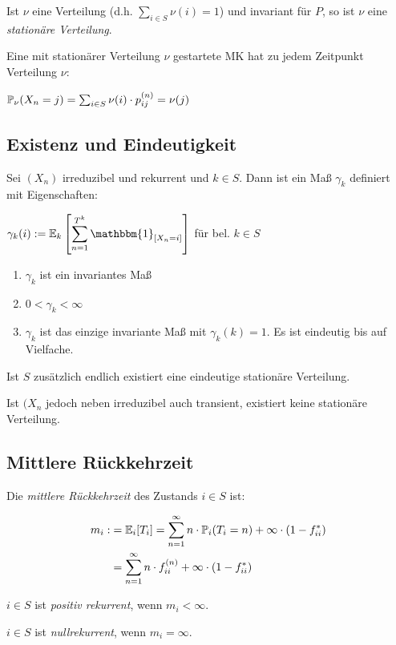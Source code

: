 \vspace*{1mm}

Ist $\nu$ eine Verteilung (d.h. $\sum_{i \in S} \nu(i) = 1$) und invariant für $P$, so ist $\nu$ eine \emph{stationäre Verteilung}.

\vspace*{1mm}

Eine mit stationärer Verteilung $\nu$ gestartete MK hat zu jedem Zeitpunkt Verteilung $\nu$:

$\P_\nu(X_n = j) = \sum_{i \in S} \nu(i) \cdot p_{ij}^{(n)} = \nu(j)$

\subsection*{Existenz und Eindeutigkeit}

Sei $(X_n)$ irreduzibel und rekurrent und $k \in S$. Dann ist ein Maß $\gamma_k$ definiert mit Eigenschaften:

$\gamma_k(i) := \mathbb{E}_k\left[\displaystyle\sum_{n=1}^{T^k} \mathbbm{1}_{[X_n=i]}\right]$ für bel. $k \in S$

\begin{enumerate}[label=(\alph*)]
	\item $\gamma_k$ ist ein invariantes Maß
	\item $0 < \gamma_k < \infty$
	\item $\gamma_k$ ist das einzige invariante Maß mit $\gamma_k(k) = 1$. Es ist eindeutig bis auf Vielfache.
\end{enumerate}

Ist $S$ zusätzlich endlich existiert eine eindeutige stationäre Verteilung.

Ist $(X_n$ jedoch neben irreduzibel auch transient, existiert keine stationäre Verteilung.

\subsection*{Mittlere Rückkehrzeit}

Die \emph{mittlere Rückkehrzeit} des Zustands $i \in S$ ist:

\vspace*{-4mm}
\begin{align*}
m_i :&= \mathbb{E}_i[T_i] = \sum_{n=1}^\infty n \cdot \P_i(T_i = n) + \infty \cdot (1-f_{ii}^*) \\
&= \sum_{n=1}^\infty n \cdot f_{ii}^{(n)} + \infty \cdot (1- f_{ii}^*)
\end{align*}

$i \in S$ ist \emph{positiv rekurrent}, wenn $m_i < \infty$.

$i \in S$ ist \emph{nullrekurrent}, wenn $m_i = \infty$.

